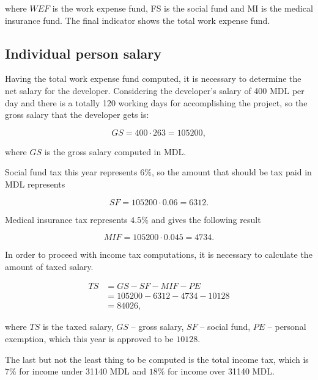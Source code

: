 \documentclass[12pt,a4paper,titlepage]{article}
\begin{document}
\noindent
where $WEF$ is the work expense fund, FS is the social fund and MI is the medical insurance fund. The final indicator shows the total work expense fund.

\subsection{Individual person salary}
Having the total work expense fund computed, it is necessary to determine the net salary for the developer. Considering the developer's salary of 400 MDL per day and there is a totally 120 working days for accomplishing the project, so the gross salary that the developer gets is:

\begin{equation}
 GS = 400 \cdot 263 = 105200,
\end{equation}

\noindent where $GS$ is the gross salary computed in MDL.

Social fund tax this year represents $6\%$, so the amount that should be tax paid in MDL represents

\begin{equation}
 SF = 105200 \cdot 0.06 = 6312.
\end{equation}

Medical insurance tax represents $4.5\%$ and gives the following result

\begin{equation}
 MIF = 105200 \cdot 0.045 = 4734.
\end{equation}

In order to proceed with income tax computations, it is necessary to calculate the amount of taxed salary.

\begin{equation}
\begin{split}
 TS &= GS - SF - MIF - PE \\
              &= 105200 - 6312 - 4734 - 10128 \\ 
              &= 84026,
\end{split}
\end{equation}

\noindent
where $TS$ is the taxed salary, $GS$ -- gross salary, $SF$ -- social fund, $PE$ -- personal exemption, which this year is approved to be $10128$.

The last but not the least thing to be computed is the total income tax, which is $7\%$ for income under 31140 MDL and $18\%$ for income over 31140 MDL.
\end{document}
